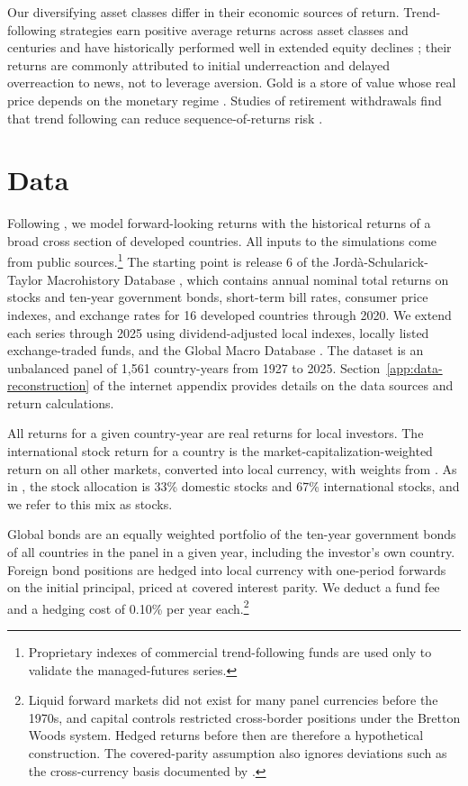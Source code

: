 \documentclass[12pt]{article}
\begin{document}
Our diversifying asset classes differ in their economic sources of return. Trend-following strategies
earn positive average returns across asset classes and centuries and have historically performed well
in extended equity declines \citep{MoskowitzOoiPedersen2012,HurstOoiPedersen2017}; their returns are
commonly attributed to initial underreaction and delayed overreaction to news, not to leverage aversion.
Gold is a store of value whose real price depends on the monetary regime \citep{ErbHarvey2013}. Studies
of retirement withdrawals find that trend following can reduce sequence-of-returns risk
\citep{ClareSeatonSmithThomas2017}.

\section{Data}
\label{sec:data}

Following \citet{AnarkulovaCederburgODoherty2022,AnarkulovaCederburgODoherty2025}, we model
forward-looking returns with the historical returns of a broad cross section of developed countries.
All inputs to the simulations come from public sources.\footnote{Proprietary indexes of commercial
trend-following funds are used only to validate the managed-futures series.} The starting point is release 6 of the Jord\`a-Schularick-Taylor
Macrohistory Database \citep{JordaEtAl2019}, which contains annual nominal total returns on stocks and
ten-year government bonds, short-term bill rates, consumer price indexes, and exchange rates for 16
developed countries through 2020. We extend each series through 2025 using dividend-adjusted local
indexes, locally listed exchange-traded funds, and the Global Macro Database
\citep{MullerXuLehbibChen2025}. The dataset is an unbalanced panel of 1,561 country-years from 1927 to
2025. Section~\ref{app:data-reconstruction} of the internet appendix provides details on the data sources
and return calculations.

All returns for a given country-year are real returns for local investors. The international stock
return for a country is the market-capitalization-weighted return on all other markets, converted into
local currency, with weights from \citet{KuvshinovZimmermann2022}. As in \citet{AnarkulovaCederburgODoherty2025}, the stock allocation is 33\% domestic stocks
and 67\% international stocks, and we refer to this mix as stocks.

Global bonds are an equally weighted portfolio of the ten-year government bonds of all countries in the
panel in a given year, including the investor's own country. Foreign bond positions are hedged into local currency
with one-period forwards on the initial principal, priced at covered interest parity. We deduct a fund fee and a hedging cost of 0.10\% per year each.\footnote{Liquid forward markets did not exist for many panel currencies
before the 1970s, and capital controls restricted cross-border positions under the Bretton Woods system.
Hedged returns before then are therefore a hypothetical construction. The covered-parity assumption also
ignores deviations such as the cross-currency basis documented by \citet{DuTepperVerdelhan2018}.}
\end{document}

